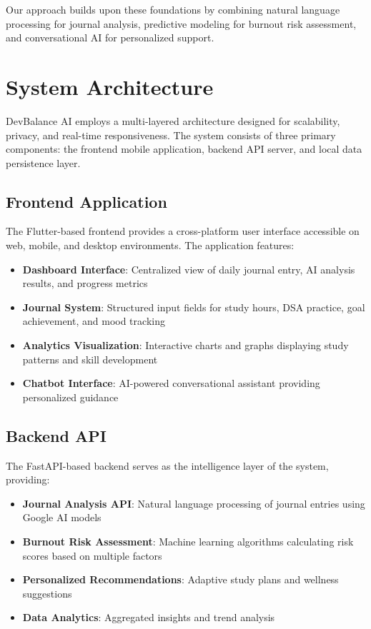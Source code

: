 \documentclass[conference,10pt]{IEEEtran}
\begin{document}
Our approach builds upon these foundations by combining natural language processing for journal analysis, predictive modeling for burnout risk assessment, and conversational AI for personalized support.

\section{System Architecture}

DevBalance AI employs a multi-layered architecture designed for scalability, privacy, and real-time responsiveness. The system consists of three primary components: the frontend mobile application, backend API server, and local data persistence layer.

\subsection{Frontend Application}

The Flutter-based frontend provides a cross-platform user interface accessible on web, mobile, and desktop environments. The application features:

\begin{itemize}
\item \textbf{Dashboard Interface}: Centralized view of daily journal entry, AI analysis results, and progress metrics
\item \textbf{Journal System}: Structured input fields for study hours, DSA practice, goal achievement, and mood tracking
\item \textbf{Analytics Visualization}: Interactive charts and graphs displaying study patterns and skill development
\item \textbf{Chatbot Interface}: AI-powered conversational assistant providing personalized guidance
\end{itemize}

\subsection{Backend API}

The FastAPI-based backend serves as the intelligence layer of the system, providing:

\begin{itemize}
\item \textbf{Journal Analysis API}: Natural language processing of journal entries using Google AI models
\item \textbf{Burnout Risk Assessment}: Machine learning algorithms calculating risk scores based on multiple factors
\item \textbf{Personalized Recommendations}: Adaptive study plans and wellness suggestions
\item \textbf{Data Analytics}: Aggregated insights and trend analysis
\end{itemize}
\end{document}
